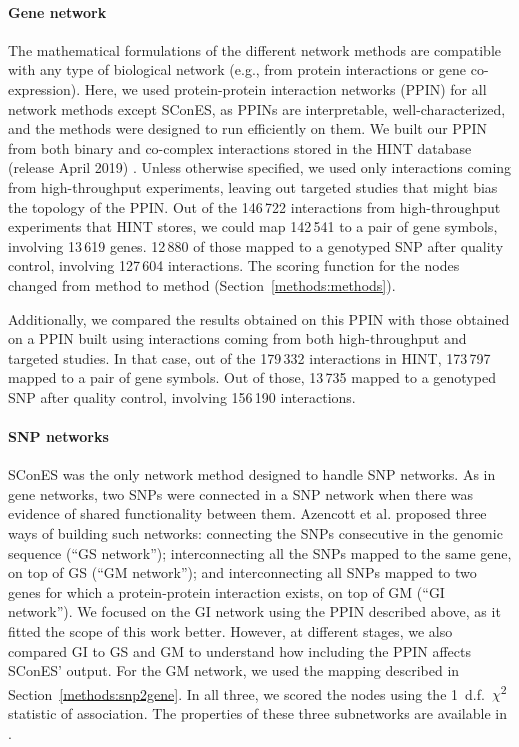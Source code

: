 \documentclass[10pt,letterpaper]{article}
\begin{document}
\paragraph{Gene network}
The mathematical formulations of the different network methods are compatible with any type of biological network (e.g., from protein interactions or gene co-expression). Here, we used protein-protein interaction networks (PPIN) for all network methods except SConES, as PPINs are interpretable, well-characterized, and the methods were designed to run efficiently on them. We built our PPIN from both binary and co-complex interactions stored in the HINT database (release April 2019) \cite{das_hint:_2012}. Unless otherwise specified, we used only interactions coming from high-throughput experiments, leaving out targeted studies that might bias the topology of the PPIN. Out of the 146\,722 interactions from high-throughput experiments that HINT stores, we could map 142\,541 to a pair of gene symbols, involving 13\,619 genes. 12\,880 of those mapped to a genotyped SNP after quality control, involving 127\,604 interactions. The scoring function for the nodes changed from method to method (Section~\ref{methods:methods}).

Additionally, we compared the results obtained on this PPIN with those obtained on a PPIN built using interactions coming from both high-throughput and targeted studies. In that case, out of the 179\,332 interactions in HINT, 173\,797 mapped to a pair of gene symbols. Out of those, 13\,735 mapped to a genotyped SNP after quality control, involving 156\,190 interactions.

\paragraph{SNP networks}
SConES \cite{azencott_efficient_2013} was the only network method designed to handle SNP networks. As in gene networks, two SNPs were connected in a SNP network when there was evidence of shared functionality between them. Azencott et al. \cite{azencott_efficient_2013} proposed three ways of building such networks: connecting the SNPs consecutive in the genomic sequence (``GS network''); interconnecting all the SNPs mapped to the same gene, on top of GS (``GM network''); and interconnecting all SNPs mapped to two genes for which a protein-protein interaction exists, on top of GM (``GI network''). We focused on the GI network using the PPIN described above, as it fitted the scope of this work better. However, at different stages, we also compared GI to GS and GM to understand how including the PPIN affects SConES' output. For the GM network, we used the mapping described in Section~\ref{methods:snp2gene}. In all three, we scored the nodes using the 1~d.f.~\(\chi\)\textsuperscript{2} statistic of association. The properties of these three subnetworks are available in .
\end{document}
